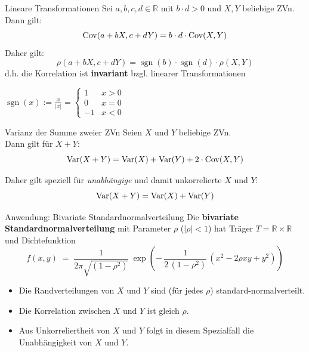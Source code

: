 \documentclass[
  10pt,
  ignorenonframetext,
]{beamer}
\begin{document}
\begin{frame}{Lineare Transformationen}
\protect\hypertarget{lineare-transformationen-1}{}
Sei \(a, b, c, d \in \mathbb{R}\) mit \(b \cdot d > 0\) und \(X, Y\)
beliebige ZVn. Dann gilt: \[
\operatorname{Cov}(a + bX, c + dY) = b \cdot d \cdot \operatorname{Cov}(X,Y)
\] Daher gilt: \[
\rho(a + bX, c + dY)  =  \operatorname{sgn}(b) \cdot \operatorname{sgn}(d) \cdot \rho(X,Y)
\] d.h. die Korrelation ist \textbf{invariant} bzgl. linearer
Transformationen

\vspace{3em}
\scriptsize

\(\operatorname{sgn}(x) := \frac{x}{|x|} = \begin{cases} 1 & x > 0 \\ 0 & x=0 \\ -1 & x<0 \end{cases}\)
\end{frame}

\begin{frame}{Varianz der Summe zweier ZVn}
\protect\hypertarget{varianz-der-summe-zweier-zvn}{}
Seien \(X\) und \(Y\) beliebige ZVn.\\
Dann gilt für \(X + Y\): \[
\operatorname{Var}(X + Y) = \operatorname{Var}(X) + \operatorname{Var}(Y) + 2 \cdot \operatorname{Cov}(X,Y)
\]

Daher gilt speziell für \emph{unabhängige} und damit unkorrelierte \(X\)
und \(Y\): \[
\operatorname{Var}(X + Y) = \operatorname{Var}(X) + \operatorname{Var}(Y)
\]

\end{frame}

\begin{frame}{Anwendung: Bivariate Standardnormalverteilung}
\protect\hypertarget{anwendung-bivariate-standardnormalverteilung}{}
Die \textbf{bivariate Standardnormalverteilung} mit Parameter \(\rho\)
(\(|\rho| < 1\)) hat Träger \(T = \mathbb R \times \mathbb R\) und
Dichtefunktion \[
f(x,y) \; = \; \frac{1}{2 \pi \sqrt{(1 - \rho^2)}} \: \exp
\left(
- \, \frac{1}{2 \, (1 - \rho^2)} \, (x^2 - 2 \rho x y + y^2)
\right)
\]

\begin{itemize}
\item
  Die Randverteilungen von \(X\) und \(Y\) sind (für jedes \(\rho\))
  standard-normalverteilt.
\item
  Die Korrelation zwischen \(X\) und \(Y\) ist gleich \(\rho\).
\item
  Aus Unkorreliertheit von \(X\) und \(Y\) folgt in diesem Spezialfall
  die Unabhängigkeit von \(X\) und \(Y\).
\end{itemize}
\end{frame}
\end{document}
